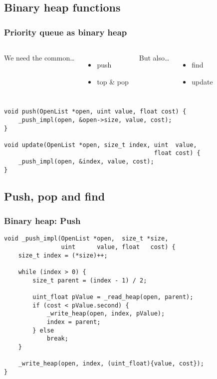 \documentclass{beamer}
\begin{document}
\subsection{Binary heap functions}
\begin{frame}[fragile]
    \frametitle{Priority queue as binary heap}
    \begin{columns}[T]
        We need the common\dots
        \begin{itemize}
            \item push
            \item top \& pop
        \end{itemize}
    
        But also\dots
        \begin{itemize}
            \item find
            \item update
        \end{itemize}
    \end{columns}
    
    \vspace{1em}
    \begin{lstlisting}
void push(OpenList *open, uint value, float cost) {
    _push_impl(open, &open->size, value, cost);
}

void update(OpenList *open, size_t index, uint  value,
                                          float cost) {
    _push_impl(open, &index, value, cost);
}
    \end{lstlisting}
\end{frame}

\subsection{Push, pop and find}
\begin{frame}[fragile]
    \frametitle{Binary heap: Push}
    \begin{lstlisting}
void _push_impl(OpenList *open,  size_t *size,
                uint      value, float   cost) {
    size_t index = (*size)++;

    while (index > 0) {
        size_t parent = (index - 1) / 2;

        uint_float pValue = _read_heap(open, parent);
        if (cost < pValue.second) {
            _write_heap(open, index, pValue);
            index = parent;
        } else
            break;
    }

    _write_heap(open, index, (uint_float){value, cost});
}
    \end{lstlisting}
\end{frame}
\end{document}
